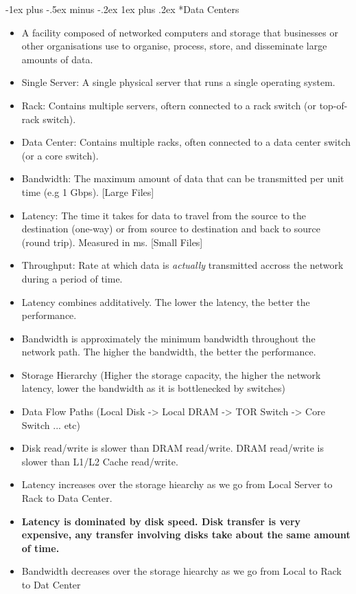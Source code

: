 \documentclass[10pt, landscape]{article}
\makeatletter
\renewcommand{\subsubsection}{\@startsection{subsubsection}{3}{0mm}%
  {-1ex plus -.5ex minus -.2ex}%
  {1ex plus .2ex}%
{\normalfont\small\bfseries}}%
\makeatother
\begin{document}
\begin{multicols*}{4}
  \subsubsection*{Data Centers}
  \begin{itemize}
    \item A facility composed of networked computers and storage that businesses or other organisations use to organise, process, store, and disseminate large amounts of data.
    \item Single Server: A single physical server that runs a single operating system.
    \item Rack: Contains multiple servers, oftern connected to a rack switch (or top-of-rack switch).
    \item Data Center: Contains multiple racks, often connected to a data center switch (or a core switch).
    \item Bandwidth: The maximum amount of data that can be transmitted per unit time (e.g 1 Gbps). [Large Files]
    \item Latency: The time it takes for data to travel from the source to the destination (one-way) or from source to destination and back to source (round trip). Measured in ms.  [Small Files]
    \item Throughput: Rate at which data is \textit{actually} transmitted accross the network during a period of time.
    \item Latency combines additatively. The lower the latency, the better the performance.
    \item Bandwidth is approximately the minimum bandwidth throughout the network path. The higher the bandwidth, the better the performance.
    \item Storage Hierarchy (Higher the storage capacity, the higher the network latency, lower the bandwidth as it is bottlenecked by switches)
    \item Data Flow Paths (Local Disk -> Local DRAM -> TOR Switch -> Core Switch ... etc)
    \item Disk read/write is slower than DRAM read/write. DRAM read/write is slower than L1/L2 Cache read/write.
    \item Latency increases over the storage hiearchy as we go from Local Server to Rack to Data Center.
    \item \textbf{Latency is dominated by disk speed. Disk transfer is very expensive, any transfer involving disks take about the same amount of time.}
    \item Bandwidth decreases over the storage hiearchy as we go from Local to Rack to Dat Center

\end{itemize}
\end{multicols*}
\end{document}
